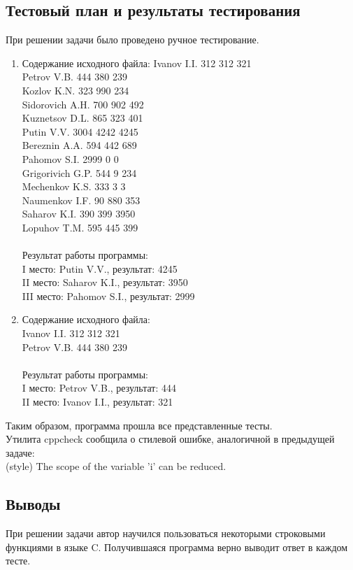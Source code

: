 \documentclass[12pt,a4paper]{report}
\begin{document}
\subsection{Тестовый план и результаты тестирования}
При решении задачи было проведено ручное тестирование.
\begin{enumerate}
\item
Содержание исходного файла:
Ivanov I.I. 312 312 321 \\
Petrov V.B. 444 380 239 \\
Kozlov K.N. 323 990 234 \\
Sidorovich A.H. 700 902 492 \\
Kuznetsov D.L. 865 323 401 \\
Putin V.V. 3004 4242 4245 \\
Bereznin A.A. 594 442 689 \\
Pahomov S.I. 2999 0 0 \\
Grigorivich G.P. 544 9 234 \\
Mechenkov K.S. 333 3 3 \\
Naumenkov I.F. 90 880 353 \\
Saharov K.I. 390 399 3950 \\
Lopuhov T.M. 595 445 399 \\ \\
Результат работы программы: \\
I место: Putin V.V., результат: 4245 \\
II место: Saharov K.I., результат: 3950 \\
III место: Pahomov S.I., результат: 2999
\item 
Содержание исходного файла: \\
Ivanov I.I. 312 312 321 \\
Petrov V.B. 444 380 239 \\ \\
Результат работы программы: \\
I место: Petrov V.B., результат: 444 \\
II место: Ivanov I.I., результат: 321 \\
\end{enumerate}
Таким образом, программа прошла все представленные тесты. \\
Утилита cppcheck сообщила о стилевой ошибке, аналогичной в предыдущей задаче: \\
(style) The scope of the variable 'i' can be reduced.
\subsection{Выводы}
При решении задачи автор научился пользоваться некоторыми строковыми функциями в языке C. Получившаяся программа верно выводит ответ в каждом тесте. \\ \\
\newpage
\end{document}
